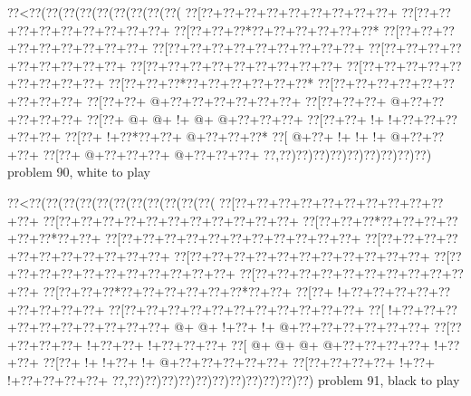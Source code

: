\vbox{\vbox{\goo
\0??<\0??(\0??(\0??(\0??(\0??(\0??(\0??(\0??(\0??(
\0??[\0??+\0??+\0??+\0??+\0??+\0??+\0??+\0??+\0??+
\0??[\0??+\0??+\0??+\0??+\0??+\0??+\0??+\0??+\0??+
\0??[\0??+\0??+\0??*\0??+\0??+\0??+\0??+\0??+\0??*
\0??[\0??+\0??+\0??+\0??+\0??+\0??+\0??+\0??+\0??+
\0??[\0??+\0??+\0??+\0??+\0??+\0??+\0??+\0??+\0??+
\0??[\0??+\0??+\0??+\0??+\0??+\0??+\0??+\0??+\0??+
\0??[\0??+\0??+\0??+\0??+\0??+\0??+\0??+\0??+\0??+
\0??[\0??+\0??+\0??+\0??+\0??+\0??+\0??+\0??+\0??+
\0??[\0??+\0??+\0??*\0??+\0??+\0??+\0??+\0??+\0??*
\0??[\0??+\0??+\0??+\0??+\0??+\0??+\0??+\0??+\0??+
\0??[\0??+\0??+\- @+\0??+\0??+\0??+\0??+\0??+\0??+
\0??[\0??+\0??+\0??+\- @+\0??+\0??+\0??+\0??+\0??+
\0??[\0??+\- @+\- @+\- !+\- @+\- @+\0??+\0??+\0??+
\0??[\0??+\0??+\- !+\- !+\0??+\0??+\0??+\0??+\0??+
\0??[\0??+\- !+\0??*\0??+\0??+\- @+\0??+\0??+\0??*
\0??[\- @+\0??+\- !+\- !+\- !+\- @+\0??+\0??+\0??+
\0??[\0??+\- @+\0??+\0??+\0??+\- @+\0??+\0??+\0??+
\0??,\0??)\0??)\0??)\0??)\0??)\0??)\0??)\0??)\0??)
}
\hfil problem 90, white to play\hfil\break
}

\vbox{\vbox{\goo
\0??<\0??(\0??(\0??(\0??(\0??(\0??(\0??(\0??(\0??(\0??(\0??(
\0??[\0??+\0??+\0??+\0??+\0??+\0??+\0??+\0??+\0??+\0??+\0??+
\0??[\0??+\0??+\0??+\0??+\0??+\0??+\0??+\0??+\0??+\0??+\0??+
\0??[\0??+\0??+\0??*\0??+\0??+\0??+\0??+\0??+\0??*\0??+\0??+
\0??[\0??+\0??+\0??+\0??+\0??+\0??+\0??+\0??+\0??+\0??+\0??+
\0??[\0??+\0??+\0??+\0??+\0??+\0??+\0??+\0??+\0??+\0??+\0??+
\0??[\0??+\0??+\0??+\0??+\0??+\0??+\0??+\0??+\0??+\0??+\0??+
\0??[\0??+\0??+\0??+\0??+\0??+\0??+\0??+\0??+\0??+\0??+\0??+
\0??[\0??+\0??+\0??+\0??+\0??+\0??+\0??+\0??+\0??+\0??+\0??+
\0??[\0??+\0??+\0??*\0??+\0??+\0??+\0??+\0??+\0??*\0??+\0??+
\0??[\0??+\- !+\0??+\0??+\0??+\0??+\0??+\0??+\0??+\0??+\0??+
\0??[\0??+\0??+\0??+\0??+\0??+\0??+\0??+\0??+\0??+\0??+\0??+
\0??[\- !+\0??+\0??+\0??+\0??+\0??+\0??+\0??+\0??+\0??+\0??+
\- @+\- @+\- !+\0??+\- !+\- @+\0??+\0??+\0??+\0??+\0??+\0??+
\0??[\0??+\0??+\0??+\0??+\- !+\0??+\0??+\- !+\0??+\0??+\0??+
\0??[\- @+\- @+\- @+\- @+\0??+\0??+\0??+\0??+\- !+\0??+\0??+
\0??[\0??+\- !+\- !+\0??+\- !+\- @+\0??+\0??+\0??+\0??+\0??+
\0??[\0??+\0??+\0??+\0??+\- !+\0??+\- !+\0??+\0??+\0??+\0??+
\0??,\0??)\0??)\0??)\0??)\0??)\0??)\0??)\0??)\0??)\0??)\0??)
}
\hfil problem 91, black to play\hfil\break
}

